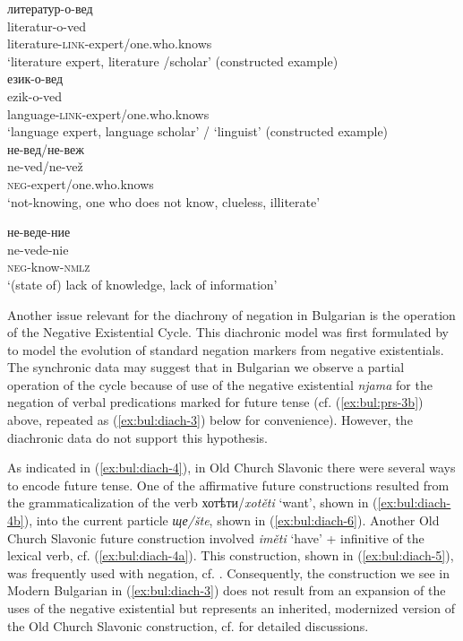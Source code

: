 \documentclass[output=paper,colorlinks=true, citecolor=brown]{langscibook}
\begin{document}
\ea \label{ex:bul:diach-2}
\ea литератур-о-вед\\ \label{ex:bul:diach-2a}
\gll literatur-o-ved\\
 literature-\textsc{link}-expert/one.who.knows\\
\glt `literature expert, literature /scholar' (constructed example)\\

\ex език-о-вед\\ \label{ex:bul:diach-2b}
\gll ezik-o-ved\\
 language-\textsc{link}-expert/one.who.knows \\
\glt `language expert, language scholar' / `linguist' (constructed example)\\

\ex не-вед/не-веж\\ \label{ex:bul:diach-2c}
\gll ne-ved/ne-vež\\
 \textsc{neg}-expert/one.who.knows \\
\glt `not-knowing, one who does not know, clueless, illiterate'

\ex не-веде-ние\\ \label{ex:bul:diach-2d}
\gll ne-vede-nie\\
 \textsc{neg}-know-\textsc{nmlz} \\
\glt `(state of) lack of knowledge, lack of information'

\z \z

\noindent 
Another issue relevant for the diachrony of negation in Bulgarian is the operation of the Negative Existential Cycle. This diachronic model was first formulated by \citet{Croft1991} to model the evolution of standard negation markers from negative existentials. The synchronic data may suggest that in Bulgarian we observe a partial operation of the cycle because of use of the negative existential \textit{njama} for the negation of verbal predications marked for future tense (cf. (\ref{ex:bul:prs-3b}) above, repeated as (\ref{ex:bul:diach-3}) below for convenience). However, the diachronic data do not support this hypothesis. 

As indicated in (\ref{ex:bul:diach-4}), in Old Church Slavonic there were several ways to encode future tense. One of the affirmative future constructions resulted from the grammaticalization of the verb хотѣти\slash \textit{xotěti} `want', shown in (\ref{ex:bul:diach-4b}), into the current particle \textit{ще/šte}, shown in (\ref{ex:bul:diach-6}). Another Old Church Slavonic future construction involved \textit{iměti} `have' + infinitive of the lexical verb, cf. (\ref{ex:bul:diach-4a}). This construction, shown in (\ref{ex:bul:diach-5}), was frequently used with negation, cf. \citet[201]{Đorđić1975}. Consequently, the construction we see in Modern Bulgarian in (\ref{ex:bul:diach-3}) does not result from an expansion of the uses of the negative existential but represents an inherited, modernized version of the Old Church Slavonic construction, cf. \citet{Veselinova2010,Veselinova2014,Veselinova2016} for detailed discussions.
\end{document}
